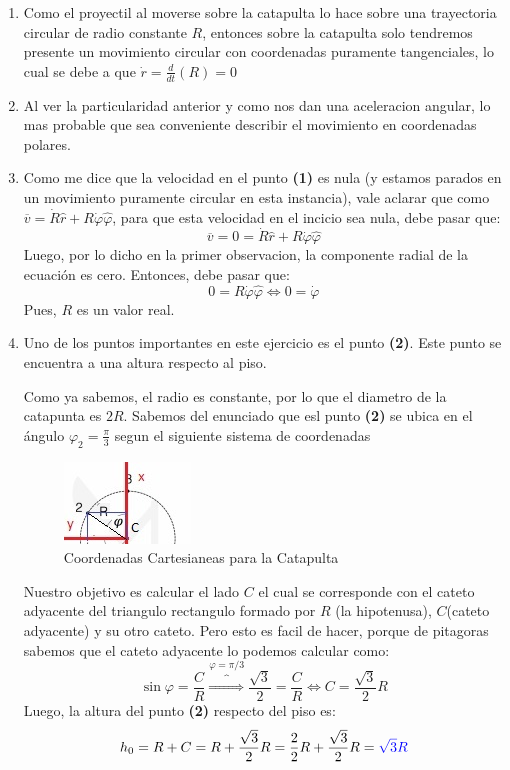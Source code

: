 \documentclass[fleqn,10pt]{SelfArx} %
\newcommand{\sii}{\Longleftrightarrow}
\newcommand{\azul}[1]{\color{blue}{#1}}
\begin{document}
\begin{enumerate}
\item Como el proyectil al moverse sobre la catapulta lo hace sobre una trayectoria circular de radio constante $R$, 
entonces sobre la catapulta solo tendremos presente un movimiento circular con coordenadas puramente tangenciales, lo cual se debe a que 
$\dot{r} = \frac{d}{dt}(R) = 0$
\item Al ver la particularidad anterior y como nos dan una aceleracion angular, lo mas probable que sea conveniente describir el movimiento en coordenadas polares.
\item Como me dice que la velocidad en el punto \textbf{(1)} es nula (y estamos parados en un movimiento puramente circular en esta instancia), vale aclarar que como $\overline{v} = \dot{R} \hat{r} + R \dot{{\varphi}} \hat{{\varphi}}$, para que esta velocidad en el incicio sea nula, debe pasar que: \[\overline{v} = 0 = \dot{R} \hat{r} + R \dot{{\varphi}} \hat{{\varphi}} \]
Luego, por lo dicho en la primer observacion, la componente radial de la ecuación es cero. Entonces, debe pasar que:
\[0 = R \dot{{\varphi}} \hat{{\varphi}} \sii 0 = \dot{{\varphi}}\]
Pues, $R$ es un valor real.
\item Uno de los puntos importantes en este ejercicio es el punto \textbf{(2)}. Este punto se encuentra a una altura respecto al piso. 

Como ya sabemos, el radio es constante, por lo que el diametro de la catapunta es $2R$. Sabemos del enunciado que esl punto \textbf{(2)} se ubica en el ángulo ${\varphi}_2 = \frac{\pi}{3}$ segun el siguiente sistema de coordenadas
\begin{figure}[h] 
\centering
\includegraphics[scale=0.8]{figuras/fig3.jpg}
\caption{Coordenadas Cartesianeas para la Catapulta}
\label{fig:3}
\end{figure}
Nuestro objetivo es calcular el lado $C$ el cual se corresponde con el cateto adyacente del triangulo rectangulo formado por $R$ (la hipotenusa), $C$(cateto adyacente) y su otro cateto. Pero esto es facil de hacer, porque de pitagoras sabemos que el cateto adyacente lo podemos calcular como:
\[\sin{\varphi} = \frac{C}{R} \overbrace{\Longrightarrow}^{\varphi = \pi/3} \frac{\sqrt{3}}{2} = \frac{C}{R} \sii C = \frac{\sqrt{3}}{2} R\] 
Luego, la altura del punto \textbf{(2)} respecto del piso es:
\[h_0 = R + C = R + \frac{\sqrt{3}}{2} R = \frac{2}{2} R + \frac{\sqrt{3}}{2} R = \azul{\sqrt{3} R}\] 

\end{enumerate}
\end{document}
